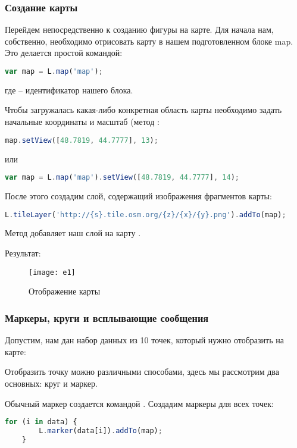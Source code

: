 \subsubsection{Создание карты}
Перейдем непосредственно к созданию фигуры на карте. Для начала нам, 
собственно, необходимо отрисовать карту в нашем подготовленном блоке map. 
Это делается простой командой:
\begin{lstlisting}[language=js]
    var map = L.map('map');
\end{lstlisting}
где  -- идентификатор нашего блока.

Чтобы загружалась какая-либо конкретная область карты необходимо задать 
начальные координаты и масштаб (метод 
:
\begin{lstlisting}[language=js]
    map.setView([48.7819, 44.7777], 13);
\end{lstlisting}
или
\begin{lstlisting}[language=js]
    var map = L.map('map').setView([48.7819, 44.7777], 14);
\end{lstlisting}

После этого создадим слой, содержащий изображения фрагментов карты:
\begin{lstlisting}[language=js]
    L.tileLayer('http://{s}.tile.osm.org/{z}/{x}/{y}.png').addTo(map);
\end{lstlisting}
Метод  добавляет наш слой на карту .

Результат:
\begin{figure}[ht!]
    \center
    \texttt{[image: e1]}
    \caption{Отображение карты}
\end{figure}

\subsubsection{Маркеры, круги и всплывающие сообщения}
Допустим, нам дан набор данных из 10 точек, который нужно отобразить на карте:


Отобразить точку можно различными способами, здесь мы рассмотрим два 
основных: круг и маркер.

Обычный маркер создается командой . 
Создадим маркеры для всех точек:
\begin{lstlisting}[language=js]
    for (i in data) {
        L.marker(data[i]).addTo(map);
    }
\end{lstlisting}

